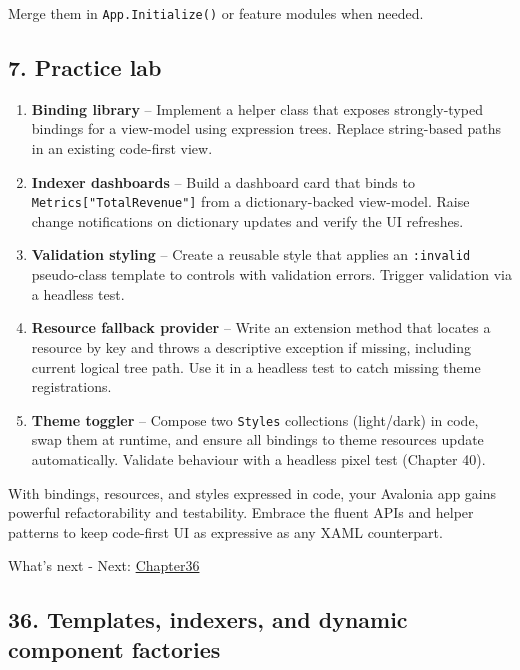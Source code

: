 Merge them in \passthrough{\lstinline!App.Initialize()!} or feature
modules when needed.

\subsection{7. Practice lab}\label{practice-lab-2}

\begin{enumerate}
\def\labelenumi{\arabic{enumi}.}
\tightlist
\item
  \textbf{Binding library} -- Implement a helper class that exposes
  strongly-typed bindings for a view-model using expression trees.
  Replace string-based paths in an existing code-first view.
\item
  \textbf{Indexer dashboards} -- Build a dashboard card that binds to
  \passthrough{\lstinline!Metrics["TotalRevenue"]!} from a
  dictionary-backed view-model. Raise change notifications on dictionary
  updates and verify the UI refreshes.
\item
  \textbf{Validation styling} -- Create a reusable style that applies an
  \passthrough{\lstinline!:invalid!} pseudo-class template to controls
  with validation errors. Trigger validation via a headless test.
\item
  \textbf{Resource fallback provider} -- Write an extension method that
  locates a resource by key and throws a descriptive exception if
  missing, including current logical tree path. Use it in a headless
  test to catch missing theme registrations.
\item
  \textbf{Theme toggler} -- Compose two \passthrough{\lstinline!Styles!}
  collections (light/dark) in code, swap them at runtime, and ensure all
  bindings to theme resources update automatically. Validate behaviour
  with a headless pixel test (Chapter 40).
\end{enumerate}

With bindings, resources, and styles expressed in code, your Avalonia
app gains powerful refactorability and testability. Embrace the fluent
APIs and helper patterns to keep code-first UI as expressive as any XAML
counterpart.

What's next - Next: \href{Chapter36.md}{Chapter36}

\newpage

\subsection{36. Templates, indexers, and dynamic component
factories}\label{templates-indexers-and-dynamic-component-factories}

